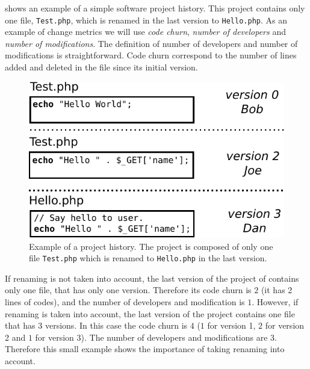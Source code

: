  shows an example of a simple software project history. This project contains only one file, \texttt{Test.php}, which is renamed in the last version to \texttt{Hello.php}. As an example of change metrics we will use \emph{code churn}, \emph{number of developers} and \emph{number of modifications}. The definition of number of developers and number of modifications is straightforward. Code churn correspond to the number of lines added and deleted in the file since its initial version.

\begin{figure}[t]
	\centering
	\includegraphics[width=0.8\linewidth,keepaspectratio]{data/figures/example.pdf}
	\caption{Example of a project history. The project is composed of only one file \texttt{Test.php} which is renamed to \texttt{Hello.php} in the last version.}
	\label{fig:example}
\end{figure}

If renaming is not taken into account, the last version of the project of  contains only one file, that has only one version. Therefore its code churn is $2$ (it has 2 lines of codes), and the number of developers and modification is $1$. However, if renaming is taken into account, the last version of the project contains one file that has $3$ versions. In this case the code churn is $4$ ($1$ for version 1, $2$ for version 2 and $1$ for version $3$). The number of developers and modifications are $3$. Therefore this small example shows the importance of taking renaming into account.

